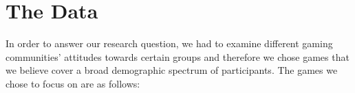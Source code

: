 \section{The Data}
In order to answer our research question, we had to examine different gaming communities' attitudes towards certain groups and therefore we chose games that we believe cover a broad demographic spectrum of participants.
The games we chose to focus on are as follows: 
    
    
    
    
    
    
    
    
    
    
    
    
    
